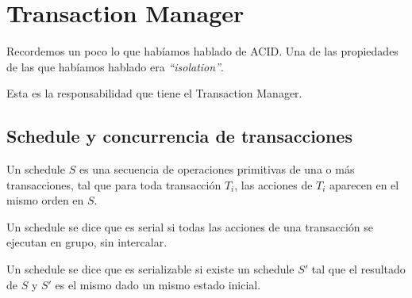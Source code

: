 \section{Transaction Manager}
Recordemos un poco lo que habíamos hablado de ACID. Una de las propiedades de las que habíamos hablado era \textit{``isolation''}.


Esta es la responsabilidad que tiene el Transaction Manager.

\subsection{Schedule y concurrencia de transacciones}
Un schedule $S$ es una secuencia de operaciones primitivas de una o más transacciones, tal que para toda transacción $T_i$, las acciones de $T_i$ aparecen en el mismo orden en $S$.

Un schedule se dice que es serial si todas las acciones de una transacción se ejecutan en grupo, sin intercalar.

Un schedule se dice que es serializable si existe un schedule $S'$ tal que el resultado de $S$ y $S'$ es el mismo dado un mismo estado inicial.

